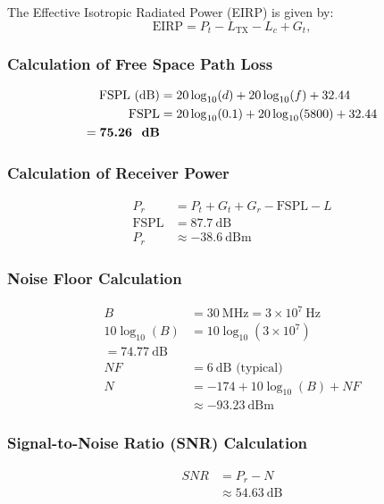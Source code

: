 \documentclass[letterpaper, 10 pt, conference]{ieeeconf}  %
\begin{document}
The Effective Isotropic Radiated Power (EIRP) is given by:
\begin{equation}
    \mathrm{EIRP} = P_t - L_{\mathrm{TX}} - L_c + G_t,
\end{equation}


\subsubsection{Calculation of Free Space Path Loss}
\begin{align*}
\text{FSPL (dB)} &= 20 \log_{10}(d) + 20 \log_{10}(f) + 32.44 \\
\text{FSPL} &= 20 \log_{10}(0.1) + 20 \log_{10}(5800) + 32.44 \\= \textbf{75.26 \text{ dB}} \\
\end{align*}

\subsubsection{Calculation of Receiver Power}
\begin{align*}
P_r &= P_t + G_t + G_r - \text{FSPL} - L \\
\text{FSPL} &= 87.7\ \text{dB} \\
P_r &\approx -38.6\ \text{dBm}
\end{align*}
\subsubsection{Noise Floor Calculation}
\begin{align*}
B &= 30\ \text{MHz} = 3 \times 10^7\ \text{Hz} \\
10 \log_{10}(B) &= 10 \log_{10}(3 \times 10^7) \\
= 74.77\ \text{dB} \\
NF &= 6\ \text{dB (typical)} \\
N &= -174 + 10 \log_{10}(B) + NF \\
&\approx -93.23\ \text{dBm}
\end{align*}

\subsubsection{Signal-to-Noise Ratio (SNR) Calculation}
\begin{align*}
SNR &= P_r - N \\
&\approx 54.63\ \text{dB}
\end{align*}
\end{document}
